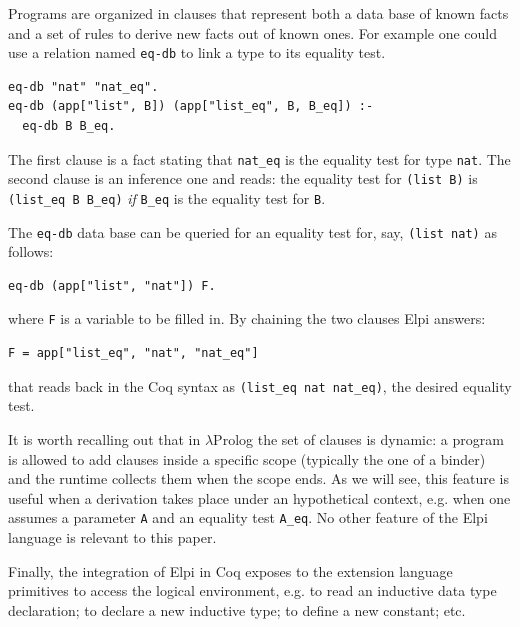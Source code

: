 \documentclass[sigplan,10pt,review]{acmart}\settopmatter{printfolios=true,printccs=false,printacmref=false}
\begin{document}
Programs are
organized in clauses that represent both a data base of known facts
and a set of rules to derive new facts out of known ones.
For example one could use a relation named \lstinline+eq-db+
to link a type to its equality test.

\begin{minipage}{\textwidth}\begin{lstlisting}
eq-db "nat" "nat_eq".
eq-db (app["list", B]) (app["list_eq", B, B_eq]) :-
  eq-db B B_eq.
\end{lstlisting}\end{minipage}

The first clause is a fact stating that
\lstinline+nat_eq+ is the equality test for type
\lstinline+nat+.
The second clause is an inference one and reads: the equality test
for \lstinline+(list B)+ is \lstinline+(list_eq B B_eq)+ \emph{if}
\lstinline+B_eq+ is the equality test for \lstinline+B+.

The \lstinline+eq-db+ data base can be queried for
an equality test for, say, \lstinline+(list nat)+ as follows:

\begin{minipage}{\textwidth}\begin{lstlisting}
eq-db (app["list", "nat"]) F.
\end{lstlisting}\end{minipage}

\noindent
where \lstinline+F+ is a variable to be filled in.
By chaining the two clauses Elpi answers:

\begin{minipage}{\textwidth}\begin{lstlisting}
F = app["list_eq", "nat", "nat_eq"]
\end{lstlisting}\end{minipage}

\noindent
that reads back in the Coq syntax as
\lstinline+(list_eq nat nat_eq)+, the desired
equality test.

It is worth recalling out that in $\lambda$Prolog the set of clauses
is dynamic: a program is allowed to add clauses inside
a specific scope (typically the one of a binder) and the runtime
collects them when the scope ends. As we will see, this feature
is useful when a derivation takes place under an hypothetical
context, e.g. when one assumes a parameter \lstinline+A+ and
an equality test \lstinline+A_eq+.
No other feature of the Elpi language is relevant to this paper.

Finally, the integration of Elpi in Coq exposes to the extension
language primitives to access the logical environment, e.g.
to read an inductive data type declaration; to declare a
new inductive type; to define a new constant; etc.
\end{document}
